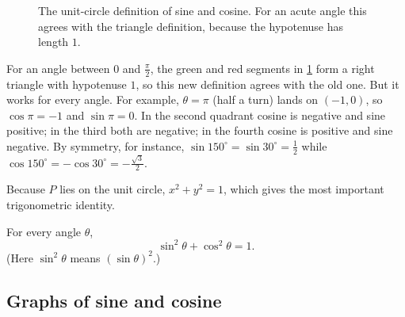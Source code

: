 \begin{figure}[htbp]
\centering
{}
\caption{The unit-circle definition of sine and cosine. For an acute angle
  this agrees with the triangle definition, because the hypotenuse has length
  $1$.}
\label{fig:unit-circle}
\end{figure}

For an angle between $0$ and $\frac{\pi}{2}$, the green and red segments in
\cref{fig:unit-circle} form a right triangle with hypotenuse $1$, so this new
definition agrees with the old one. But it works for every angle. For example,
$\theta = \pi$ (half a turn) lands on $(-1, 0)$, so $\cos\pi = -1$ and
$\sin\pi = 0$. In the second quadrant cosine is negative and sine positive; in
the third both are negative; in the fourth cosine is positive and sine
negative. By symmetry, for instance, $\sin 150^\circ = \sin 30^\circ = \frac12$
while $\cos150^\circ = -\cos 30^\circ = -\frac{\sqrt3}{2}$.

Because $P$ lies on the unit circle, $x^2 + y^2 = 1$, which gives the most
important trigonometric identity.

\begin{theorem}\label{thm:pythagorean-identity}
For every angle $\theta$,
\[
  \sin^2\theta + \cos^2\theta = 1 .
\]
(Here $\sin^2\theta$ means $(\sin\theta)^2$.)
\end{theorem}

\subsection{Graphs of sine and cosine}

